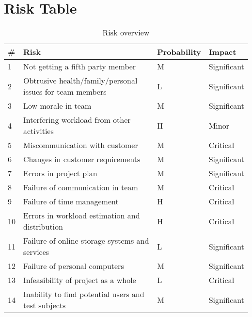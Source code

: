 \chapter{Risk Table}

\begin{table}
\begin{tabularx}{\textwidth}{ | l | X | l | l | }
  \hline
  \textbf{\#} & \textbf{Risk} & \textbf{Probability} & \textbf{Impact} \\ \hline
  1 & Not getting a fifth party member & M & Significant \\ \hline
  2 & Obtrusive health/family/personal issues for team members & L & Significant \\ \hline
  3 & Low morale in team & M & Significant \\ \hline
  4 & Interfering workload from other activities & H & Minor \\ \hline
  5 & Miscommunication with customer & M & Critical \\ \hline
  6 & Changes in customer requirements & M & Significant \\ \hline
  7 & Errors in project plan & M & Significant \\ \hline
  8 & Failure of communication in team & M & Critical \\ \hline
  9 & Failure of time management & H & Critical \\ \hline
 10 & Errors in workload estimation and distribution & H & Critical \\ \hline
 11 & Failure of online storage systems and services & L & Significant \\ \hline
 12 & Failure of personal computers & M & Significant \\ \hline
 13 & Infeasibility of project as a whole & L & Critical \\ \hline
 14 & Inability to find potential users and test subjects & M & Significant \\ \hline
\end{tabularx}
\caption{Risk overview}
\end{table}


